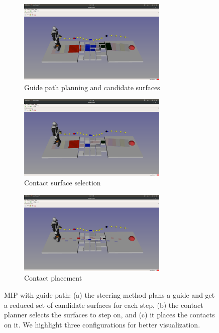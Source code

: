 \begin{figure}[H]
    \centering
    \captionsetup[subfigure]{justification=centering}
    \begin{subfigure}[t]{0.7\linewidth}
        \includegraphics[trim={10cm 8cm 10cm 10cm},clip,width=\textwidth,height=4cm]{Figures/Chapter_MIP_SL1M/rubbles/rubbles_steps_4_9_14.png}
        \caption{Guide path planning and candidate surfaces\label{fig:rubbles:surf_sel_0}}
    \end{subfigure}
    \begin{subfigure}[t]{0.7\linewidth}
        \includegraphics[trim={10cm 8cm 10cm 10cm},clip,width=\textwidth,height=4cm]{Figures/Chapter_MIP_SL1M/rubbles/rubbles_steps_4_9_14_selected.png}
        \caption{Contact surface selection\label{fig:rubbles:surf_sel_1}}
    \end{subfigure}
    \begin{subfigure}[t]{0.7\linewidth}
        \includegraphics[trim={10cm 8cm 10cm 10cm},clip,width=\textwidth,height=4cm]{Figures/Chapter_MIP_SL1M/rubbles/rubbles_steps_4_9_14_steps.png}
        \caption{Contact placement\label{fig:rubbles:surf_sel_2}}
    \end{subfigure}
    \caption{MIP with guide path: (a) the steering method plans a guide and get a reduced set of candidate surfaces for each step, (b) the contact planner selects the surfaces to step on, and (c) it places the contacts on it. We highlight three configurations for better visualization.\label{fig:rubbles:surf_sel}}
\end{figure}

